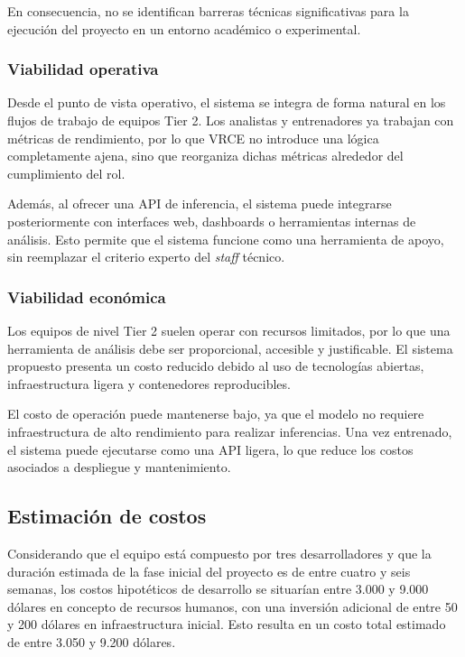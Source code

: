 \documentclass{ULBreport} %
\begin{document}
En consecuencia, no se identifican barreras técnicas significativas para la ejecución del proyecto en un entorno académico o experimental.

\subsubsection{Viabilidad operativa}

Desde el punto de vista operativo, el sistema se integra de forma natural en los flujos de trabajo de equipos Tier 2. Los analistas y entrenadores ya trabajan con métricas de rendimiento, por lo que VRCE no introduce una lógica completamente ajena, sino que reorganiza dichas métricas alrededor del cumplimiento del rol.

Además, al ofrecer una API de inferencia, el sistema puede integrarse posteriormente con interfaces web, dashboards o herramientas internas de análisis. Esto permite que el sistema funcione como una herramienta de apoyo, sin reemplazar el criterio experto del \textit{staff} técnico.

\subsubsection{Viabilidad económica}

Los equipos de nivel Tier 2 suelen operar con recursos limitados, por lo que una herramienta de análisis debe ser proporcional, accesible y justificable. El sistema propuesto presenta un costo reducido debido al uso de tecnologías abiertas, infraestructura ligera y contenedores reproducibles.

El costo de operación puede mantenerse bajo, ya que el modelo no requiere infraestructura de alto rendimiento para realizar inferencias. Una vez entrenado, el sistema puede ejecutarse como una API ligera, lo que reduce los costos asociados a despliegue y mantenimiento.

\subsection{Estimación de costos}

Considerando que el equipo está compuesto por tres desarrolladores y que la duración estimada de la fase inicial del proyecto es de entre cuatro y seis semanas, los costos hipotéticos de desarrollo se situarían entre 3.000 y 9.000 dólares en concepto de recursos humanos, con una inversión adicional de entre 50 y 200 dólares en infraestructura inicial. Esto resulta en un costo total estimado de entre 3.050 y 9.200 dólares.
\end{document}

